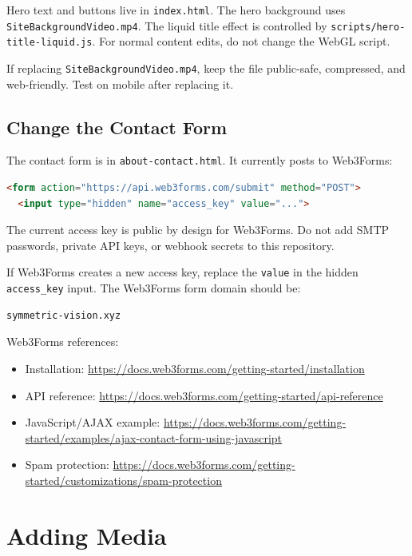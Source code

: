 \documentclass[11pt]{article}
\begin{document}
Hero text and buttons live in \texttt{index.html}. The hero background uses \texttt{SiteBackgroundVideo.mp4}. The liquid title effect is controlled by \texttt{scripts/hero-title-liquid.js}. For normal content edits, do not change the WebGL script.

If replacing \texttt{SiteBackgroundVideo.mp4}, keep the file public-safe, compressed, and web-friendly. Test on mobile after replacing it.

\subsection{Change the Contact Form}

The contact form is in \texttt{about-contact.html}. It currently posts to Web3Forms:

\begin{lstlisting}[language=HTML]
<form action="https://api.web3forms.com/submit" method="POST">
  <input type="hidden" name="access_key" value="...">
\end{lstlisting}

The current access key is public by design for Web3Forms. Do not add SMTP passwords, private API keys, or webhook secrets to this repository.

If Web3Forms creates a new access key, replace the \texttt{value} in the hidden \texttt{access\_key} input. The Web3Forms form domain should be:

\begin{lstlisting}
symmetric-vision.xyz
\end{lstlisting}

Web3Forms references:

\begin{itemize}
  \item Installation: \url{https://docs.web3forms.com/getting-started/installation}
  \item API reference: \url{https://docs.web3forms.com/getting-started/api-reference}
  \item JavaScript/AJAX example: \url{https://docs.web3forms.com/getting-started/examples/ajax-contact-form-using-javascript}
  \item Spam protection: \url{https://docs.web3forms.com/getting-started/customizations/spam-protection}
\end{itemize}

\section{Adding Media}
\end{document}

